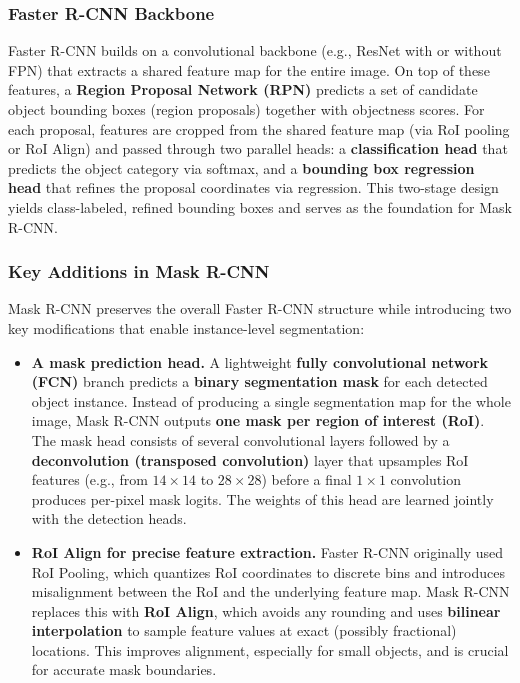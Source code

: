 \subsubsection{Faster R-CNN Backbone}

\noindent Faster R-CNN builds on a convolutional backbone (e.g., ResNet with or without FPN) that extracts a shared feature map for the entire image. On top of these features, a \textbf{Region Proposal Network (RPN)} predicts a set of candidate object bounding boxes (region proposals) together with objectness scores. For each proposal, features are cropped from the shared feature map (via RoI pooling or RoI Align) and passed through two parallel heads: a \textbf{classification head} that predicts the object category via softmax, and a \textbf{bounding box regression head} that refines the proposal coordinates via regression. This two-stage design yields class-labeled, refined bounding boxes and serves as the foundation for Mask R-CNN.

\subsubsection{Key Additions in Mask R-CNN}

\noindent Mask R-CNN preserves the overall Faster R-CNN structure while introducing two key modifications that enable instance-level segmentation:

\begin{itemize}
	\item \textbf{A mask prediction head.} A lightweight \textbf{fully convolutional network (FCN)} branch predicts a \textbf{binary segmentation mask} for each detected object instance. Instead of producing a single segmentation map for the whole image, Mask R-CNN outputs \textbf{one mask per region of interest (RoI)}. The mask head consists of several convolutional layers followed by a \textbf{deconvolution (transposed convolution)} layer that upsamples RoI features (e.g., from \(14 \times 14\) to \(28 \times 28\)) before a final \(1 \times 1\) convolution produces per-pixel mask logits. The weights of this head are learned jointly with the detection heads.
	
	\newpage
	
	\item \textbf{RoI Align for precise feature extraction.} Faster R-CNN originally used RoI Pooling, which quantizes RoI coordinates to discrete bins and introduces misalignment between the RoI and the underlying feature map. Mask R-CNN replaces this with \textbf{RoI Align}, which avoids any rounding and uses \textbf{bilinear interpolation} to sample feature values at exact (possibly fractional) locations. This improves alignment, especially for small objects, and is crucial for accurate mask boundaries.
\end{itemize}

